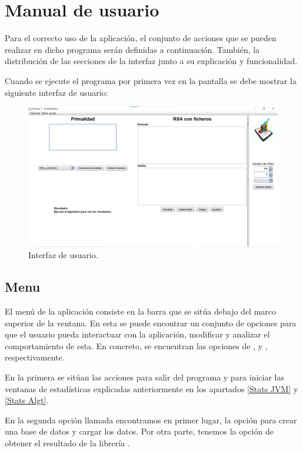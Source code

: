 \section{Manual de usuario}\label{Manual usuario}

Para el correcto uso de la aplicación, el conjunto de acciones que se pueden realizar en dicho programa serán definidas a continuación. También, la distribución de las secciones de la interfaz junto a su explicación y funcionalidad.\bigskip

Cuando se ejecute el programa por primera vez en la pantalla se debe mostrar la siguiente interfaz de usuario:

\begin{figure}[!h]
    \centering
    \includegraphics[width=\linewidth]{Usage/img/GUI.png}
    \caption{Interfaz de usuario.}
    \label{fig:User_interface}
\end{figure}

\subsection{Menu}\label{Manual usuario, Header}

El menú de la aplicación consiste en la barra que se sitúa debajo del marco superior de la ventana. En esta se puede encontrar un conjunto de opciones para que el usuario pueda interactuar con la aplicación, modificar y analizar el comportamiento de esta. En concreto, se encuentran las opciones de ,  y , respectivamente.\bigskip

En la primera se sitúan las acciones para salir del programa y para iniciar las ventanas de estadísticas explicadas anteriormente en los apartados \ref{Stats JVM} y \ref{Stats Algt}.\bigskip

En la segunda opción llamada  encontramos en primer lugar, la opción para crear una base de datos y cargar los datos. Por otra parte, tenemos la opción de obtener el resultado de la librería .\bigskip

